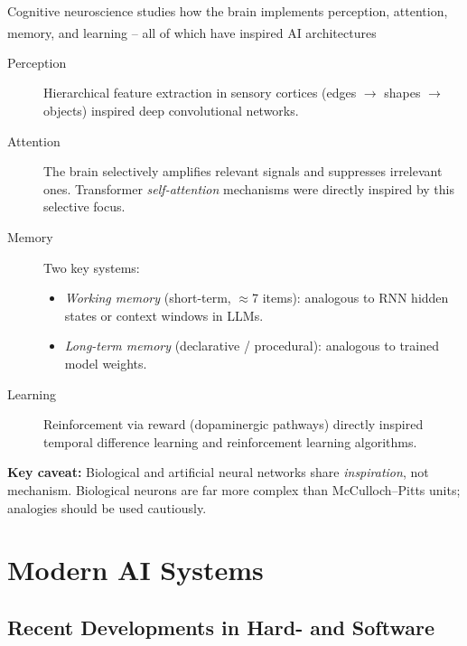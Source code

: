     \begin{tcbitemize}[ skin=sectionraster ]
        \tcbitem[title={Cognitive Processes and AI Analogies}, raster multicolumn=6]
        Cognitive neuroscience studies how the brain implements perception, attention, memory, and learning -- all of which have inspired AI architectures\textsuperscript{\cite[][p.~13]{Kriesel2007NeuralNetworks}}

        \begin{description}
            \item[Perception] Hierarchical feature extraction in sensory cortices (edges $\to$ shapes $\to$ objects) inspired deep convolutional networks.
            \item[Attention] The brain selectively amplifies relevant signals and suppresses irrelevant ones. Transformer \emph{self-attention} mechanisms were directly inspired by this selective focus.
            \item[Memory] Two key systems:
                \begin{itemize}
                    \item \emph{Working memory} (short-term, $\approx$7 items): analogous to RNN hidden states or context windows in LLMs.
                    \item \emph{Long-term memory} (declarative / procedural): analogous to trained model weights.
                \end{itemize}
            \item[Learning] Reinforcement via reward (dopaminergic pathways) directly inspired temporal difference learning and reinforcement learning algorithms.
        \end{description}

        \textbf{Key caveat:} Biological and artificial neural networks share \emph{inspiration}, not mechanism. Biological neurons are far more complex than McCulloch--Pitts units; analogies should be used cautiously.
    \end{tcbitemize}

    \section{Modern AI Systems}
    \subsection{Recent Developments in Hard- and Software}

